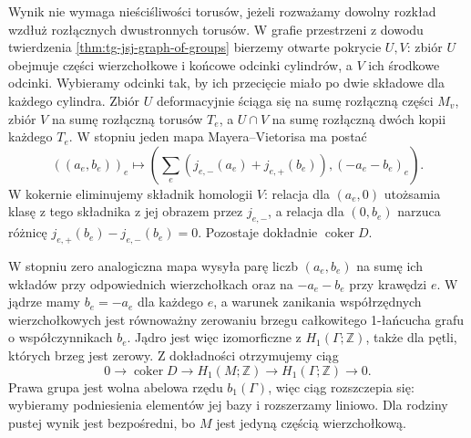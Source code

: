 \begin{uwaga}
Wynik nie wymaga nieściśliwości torusów, jeżeli
rozważamy dowolny rozkład wzdłuż rozłącznych
dwustronnych torusów. W grafie przestrzeni
z dowodu twierdzenia \ref{thm:tg-jsj-graph-of-groups}
bierzemy otwarte pokrycie $U,V$: zbiór $U$
obejmuje części wierzchołkowe i końcowe odcinki
cylindrów, a $V$ ich środkowe odcinki.
Wybieramy odcinki tak, by ich przecięcie miało
po dwie składowe dla każdego cylindra.
Zbiór $U$ deformacyjnie ściąga się na sumę
rozłączną części $M_v$, zbiór $V$ na sumę
rozłączną torusów $T_e$, a $U\cap V$ na sumę
rozłączną dwóch kopii każdego $T_e$.
W stopniu jeden mapa Mayera--Vietorisa ma postać
\[
((a_e,b_e))_e\longmapsto
\left(\sum_e(j_{e,-}(a_e)+j_{e,+}(b_e)),
(-a_e-b_e)_e\right).
\]
W kokernie eliminujemy składnik homologii $V$:
relacja dla $(a_e,0)$ utożsamia klasę z tego
składnika z jej obrazem przez $j_{e,-}$,
a relacja dla $(0,b_e)$ narzuca różnicę
$j_{e,+}(b_e)-j_{e,-}(b_e)=0$.
Pozostaje dokładnie $\operatorname{coker}D$.

W stopniu zero analogiczna mapa wysyła
parę liczb $(a_e,b_e)$ na sumę ich wkładów
przy odpowiednich wierzchołkach oraz na
$-a_e-b_e$ przy krawędzi $e$. W jądrze mamy
$b_e=-a_e$ dla każdego $e$, a warunek
zanikania współrzędnych wierzchołkowych
jest równoważny zerowaniu brzegu całkowitego
1-łańcucha grafu o współczynnikach $b_e$.
Jądro jest więc izomorficzne z $H_1(\Gamma;\mathbb Z)$,
także dla pętli, których brzeg jest zerowy.
Z dokładności otrzymujemy ciąg
\[
0\to\operatorname{coker}D\to H_1(M;\mathbb Z)
\to H_1(\Gamma;\mathbb Z)\to0.
\]
Prawa grupa jest wolna abelowa rzędu $b_1(\Gamma)$,
więc ciąg rozszczepia się: wybieramy podniesienia
elementów jej bazy i rozszerzamy liniowo.
Dla rodziny pustej wynik jest bezpośredni,
bo $M$ jest jedyną częścią wierzchołkową.
\end{uwaga}

